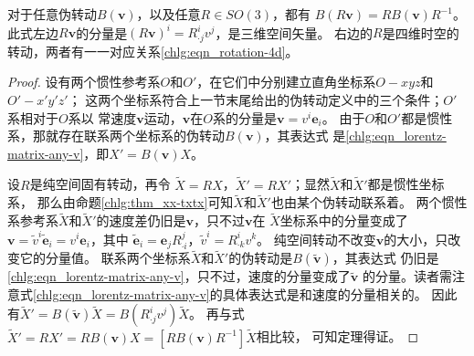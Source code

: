 \begin{proposition}\label{chlg:thm_b-rbr}
    对于任意伪转动$B(\boldsymbol{v})$，以及任意$R\in SO(3)$，都有
        $B(R\boldsymbol{v}) = R B(\boldsymbol{v}) R^{-1}$。
    此式左边$R\boldsymbol{v}$的分量是$(R\boldsymbol{v})^i = R^i_{\cdot j}v^j$，是三维空间矢量。
    右边的$R$是四维时空的转动，两者有一一对应关系\eqref{chlg:eqn_rotation-4d}。
\end{proposition}
\begin{proof}
    设有两个惯性参考系$O$和$O'$，在它们中分别建立直角坐标系$O-xyz$和$O'-x'y'z'$；
    这两个坐标系符合上一节末尾给出的伪转动定义中的三个条件；$O'$系相对于$O$系以
    常速度$\boldsymbol{v}$运动，$\boldsymbol{v}$在$O$系的分量是$\boldsymbol{v}=v^i \boldsymbol{e}_i$。
    由于$O$和$O'$都是惯性系，那就存在联系两个坐标系的伪转动$B(\boldsymbol{v})$，其表达式
    是\eqref{chlg:eqn_lorentz-matrix-any-v}，即$X' = {B}( \boldsymbol{v} )X$。
    
    设$R$是纯空间固有转动，再令
    $\tilde{X}=RX$，$\tilde{X}'=RX'$；显然$\tilde{X}$和$\tilde{X}'$都是惯性坐标系，
    那么由命题\ref{chlg:thm_xx-txtx}可知$\tilde{X}$和$\tilde{X}'$也由某个伪转动联系着。
    两个惯性系参考系$\tilde{X}$和$\tilde{X}'$的速度差仍旧是$\boldsymbol{v}$，只不过$\boldsymbol{v}$在
    $\tilde{X}$坐标系中的分量变成了$\boldsymbol{v}=\tilde{v}^i { \tilde{\boldsymbol{e}}}_i=
    {v}^i { {\boldsymbol{e}}}_i$，其中
    $\tilde{\boldsymbol{e}}_i = \boldsymbol{e}_j R^j_{\cdot i}$，$\tilde{v}^i =  R^i_{\cdot k}v^k$。
    纯空间转动不改变$\boldsymbol{v}$的大小，只改变它的分量值。
    联系两个坐标系$\tilde{X}$和$\tilde{X}'$的伪转动是$B(\tilde{\boldsymbol{v}})$，其表达式
    仍旧是\eqref{chlg:eqn_lorentz-matrix-any-v}，只不过，速度的分量变成了$\tilde{\boldsymbol{v}}$
    的分量。读者需注意式\eqref{chlg:eqn_lorentz-matrix-any-v}的具体表达式是和速度的分量相关的。
    因此有$\tilde{X}'=B(\tilde{\boldsymbol{v}})\tilde{X}=B( R^i_{\cdot j}v^j)\tilde{X}$。
    再与式$ \tilde X' = RX' = R{B}\left( \boldsymbol{v} \right)X
    =  \left[ {R{B}\left( \boldsymbol{v} \right){R^{ - 1}}} \right]\tilde X $相比较，
    可知定理得证。
\end{proof}



